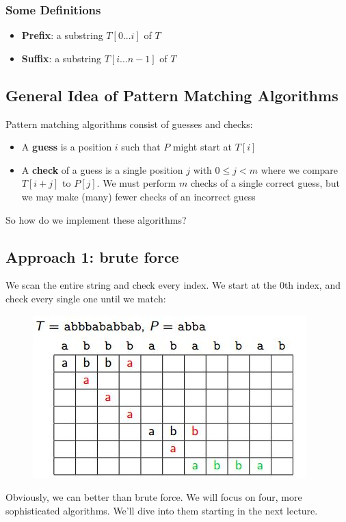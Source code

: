 \documentclass{report}
\begin{document}
\subsubsection{Some Definitions}
\begin{itemize}
\item \textbf{Prefix}: a substring $T[0 ... i]$ of $T$
\item \textbf{Suffix}: a substring $T[i ... n-1]$ of $T$
\end{itemize}
\subsection{General Idea of Pattern Matching Algorithms}
Pattern matching algorithms consist of guesses and checks:
\begin{itemize}
\item A \textbf{guess} is a position $i$ such that $P$ might start at $T[i]$
\item A \textbf{check} of a guess is a single position $j$ with $0 \leq j < m$ where we compare $T[i+j]$ to $P[j]$. We must perform $m$ checks of a single correct guess, but we may make (many) fewer checks of an incorrect guess
\end{itemize}
So how do we implement these algorithms?
\subsection{Approach 1: brute force}
We scan the entire string and check every index. We start at the 0th index, and check every single one until we match:
\begin{figure}[ht]
\begin{center}
\includegraphics[scale=0.8]{brute.jpg}
\end{center}
\end{figure}
Obviously, we can better than brute force. We will focus on four, more sophisticated algorithms. We'll dive into them starting in the next lecture.

\end{document}
